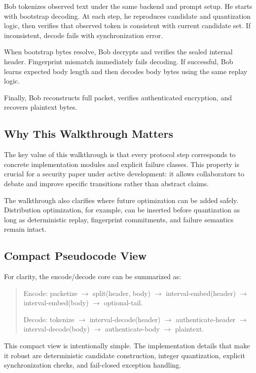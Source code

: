 Bob tokenizes observed text under the same backend and prompt setup. He starts with bootstrap decoding. At each step, he reproduces candidate and quantization logic, then verifies that observed token is consistent with current candidate set. If inconsistent, decode fails with synchronization error.

When bootstrap bytes resolve, Bob decrypts and verifies the sealed internal header. Fingerprint mismatch immediately fails decoding. If successful, Bob learns expected body length and then decodes body bytes using the same replay logic.

Finally, Bob reconstructs full packet, verifies authenticated encryption, and recovers plaintext bytes.

\subsection{Why This Walkthrough Matters}

The key value of this walkthrough is that every protocol step corresponds to concrete implementation modules and explicit failure classes. This property is crucial for a security paper under active development: it allows collaborators to debate and improve specific transitions rather than abstract claims.

The walkthrough also clarifies where future optimization can be added safely. Distribution optimization, for example, can be inserted before quantization as long as deterministic replay, fingerprint commitments, and failure semantics remain intact.

\subsection{Compact Pseudocode View}

For clarity, the encode/decode core can be summarized as:

\begin{quote}
Encode:
packetize $\rightarrow$ split(header, body) $\rightarrow$ interval-embed(header) $\rightarrow$ interval-embed(body) $\rightarrow$ optional-tail.

Decode:
tokenize $\rightarrow$ interval-decode(header) $\rightarrow$ authenticate-header $\rightarrow$ interval-decode(body) $\rightarrow$ authenticate-body $\rightarrow$ plaintext.
\end{quote}

This compact view is intentionally simple. The implementation details that make it robust are deterministic candidate construction, integer quantization, explicit synchronization checks, and fail-closed exception handling.

